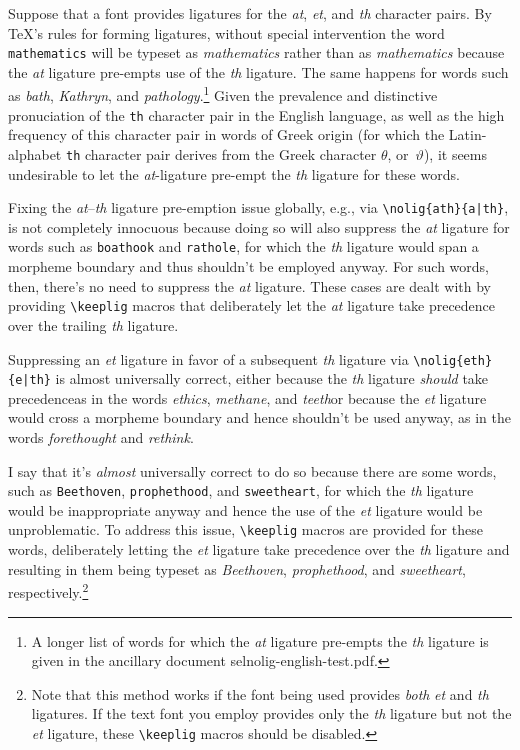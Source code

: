 \documentclass[12pt]{article}
\newcommand{\pkg}[1]{\textsf{#1}}
\newcommand{\opt}[1]{\texttt{#1}}
\newcommand{\cmmd}[1]{\texttt{\textbackslash #1}}
\begin{document}
Suppose that a font provides ligatures for the \emph{at}, \emph{et}, and \emph{th} character pairs. By \TeX's rules for forming ligatures, without special intervention the word \opt{mathematics} will be typeset as \emph{m\mbox{at}hematics} rather than as \emph{mathematics} because the \emph{at} ligature pre-empts use of the \emph{th} ligature. The same happens for words such as \emph{b\mbox{at}h}, \emph{K\mbox{at}hryn}, and \emph{p\mbox{at}hology}.\footnote{A longer list of words for which the \emph{at} ligature pre-empts the \emph{th} ligature is given in the ancillary document \pkg{selnolig-english-test.pdf}. }
Given the prevalence and distinctive pronuciation of the \opt{th} character pair in the English language, as well as the high frequency of this character pair in words of Greek origin (for which the Latin-alphabet \opt{th} character pair derives from the Greek character $\theta$, or~$\vartheta$), it seems undesirable to let the \emph{at}-ligature pre-empt the \emph{th} ligature for these words. 

Fixing the \emph{at}--\emph{th} ligature pre-emption issue globally, e.g., via \Verb+\nolig{ath}{a|th}+, is not completely innocuous because doing so will also suppress the \emph{at} ligature for words such as \opt{boathook} and \opt{rathole}, for which the \emph{th} ligature would span a morpheme boundary and thus shouldn't be employed anyway. For such words, then, there's no need to suppress the \emph{at} ligature. These cases are dealt with by providing \cmmd{keeplig} macros that deliberately let the \emph{at} ligature take precedence over the trailing \emph{th} ligature.

Suppressing an \emph{et} ligature in favor of a subsequent \emph{th} ligature via \Verb+\nolig{eth}{e|th}+ is almost universally correct, either because the \emph{th} ligature \emph{should} take precedence\textemdash as in the words \emph{ethics}, \emph{methane}, and \emph{teeth}\textemdash or because the \emph{et} ligature would cross a morpheme boundary and hence shouldn't be used anyway, as in the words \emph{forethought} and \emph{rethink}. 

I say that it's \emph{almost} universally correct to do so because there are some words, such as \opt{Beethoven}, \opt{prophethood}, and \opt{sweetheart}, for which the \emph{th} ligature would be inappropriate anyway and hence the use of the \emph{et} ligature would be unproblematic. 
To address this issue, \cmmd{keeplig} macros are provided for these words, deliberately letting the \emph{et} ligature take precedence over the \emph{th} ligature and resulting in them being typeset as \emph{Beethoven}, \emph{prophethood}, and \emph{sweetheart}, respectively.\footnote{Note that this method works if the font being used provides \emph{both} \emph{et} and \emph{th} ligatures. If the text font you employ provides only the \emph{th} ligature but not the \emph{et} ligature, these \cmmd{keeplig} macros should be disabled.}
\end{document}

